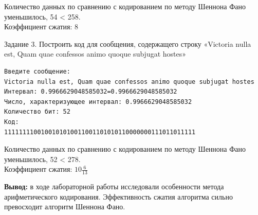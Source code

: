 \documentclass[a4paper,14pt]{extarticle}
\begin{document}
Количество данных по сравнению с кодированием по методу Шеннона Фано уменьшилось, 54 < 258.\\
Коэффициент сжатия: $8$

Задание 3. Построить код для сообщения, содержащего строку «Victoria nulla est, Quam quae confessos animo quoque subjugat hostes»

\begin{verbatim}
Введите сообщение: 
Victoria nulla est, Quam quae confessos animo quoque subjugat hostes
Интервал: 0.9966629048585032=0.9966629048585032
Число, характеризующее интервал: 0.9966629048585032
Количество бит: 52
Код: 
1111111100100101010011001101010110000000111011011111
\end{verbatim}

Количество данных по сравнению с кодированием по методу Шеннона Фано уменьшилось, 52 < 278.\\
Коэффициент сжатия: $10\frac{6}{13}$

\textbf{Вывод: } в ходе лабораторной работы исследовали особенности метода арифметического кодирования. Эффективность
сжатия алгоритма сильно превосходит алгоритм Шеннона Фано.
\end{document}
